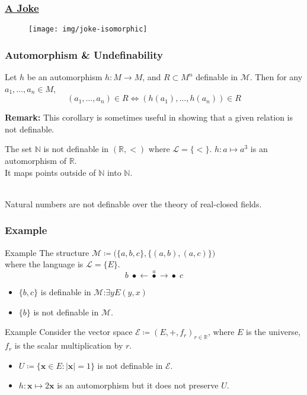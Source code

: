 \documentclass[UTF8,11pt,colorlinks,compress,openany]{beamer}%
\begin{document}
\begin{frame}\frametitle{\href{https://mathoverflow.net/questions/53122/mathematical-urban-legends}{A Joke}}
	\begin{figure}
	\texttt{[image: img/joke-isomorphic]}
	\end{figure}
\end{frame}

\begin{frame}\frametitle{Automorphism \& Undefinability}
	\begin{corollary}
		Let $h$ be an automorphism $h: M\to M$, and $R\subset M^n$ definable in $\mathcal{M}$. Then for any $a_1,\dots,a_n\in M$,
		\[(a_1,\dots,a_n)\in R\iff(h(a_1),\dots,h(a_n))\in R\]
	\end{corollary}
	\textbf{Remark:} This corollary is sometimes useful in showing that a given relation is not definable.
	\begin{block}{The set $\mathbb{N}$ is not definable in $(\mathbb{R},<)$ where $\mathscr{L}=\{<\}$.}
		$h: a\mapsto a^3$ is an automorphism of $\mathbb{R}$.\\
		It maps points outside of $\mathbb{N}$ into $\mathbb{N}$.
	\end{block}
	\begin{center}
		\\
		Natural numbers are not definable over the theory of real-closed fields.
	\end{center}
\end{frame}

\begin{frame}\frametitle{Example}
\setlength\belowdisplayskip{0pt}
\begin{block}{Example}
	The structure $\mathcal{M}\coloneqq \big(\{a,b,c\},\{(a,b),(a,c)\}\big)$\\
	where the language is $\mathscr{L}=\{E\}$.
	\[b\;\bullet\mathbf{\leftarrow}\stackrel{a}{\bullet}\mathbf{\to}\bullet\;c\]
	\begin{itemize}
		\item $\{b,c\}$ is definable in $\mathcal{M}$:\quad $\exists y E(y,x)$
		\item $\{b\}$ is not definable in $\mathcal{M}$.
	\end{itemize}
\end{block}
\begin{block}{Example}
Consider the vector space $\mathcal{E}\coloneqq (E,+,f_r)_{r\in\mathbb{R}}$, where $E$ is the universe, $f_r$ is the scalar multiplication by $r$.
\begin{itemize}
	\item $U\coloneqq \{\mathbf{x}\in E: |\mathbf{x}|=1\}$ is not definable in $\mathcal{E}$.
	\item $h:\mathbf{x}\mapsto 2\mathbf{x}$ is an automorphism but it does not preserve $U$.
\end{itemize}
\end{block}
\end{frame}
\end{document}
